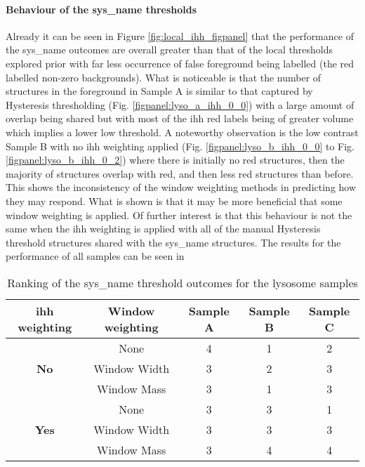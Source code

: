 \paragraph{Behaviour of the \gls{sys_name} thresholds}
Already it can be seen in Figure \ref{fig:local_ihh_figpanel} that the performance of the \gls{sys_name} outcomes are overall greater than that of the local thresholds explored prior with far less occurrence of false foreground being labelled (the red labelled non-zero backgrounds). What is noticeable is that the number of structures in the foreground in Sample A is similar to that captured by Hysteresis thresholding (Fig. \ref{figpanel:lyso_a_ihh_0_0}) with a large amount of overlap being shared but with most of the \gls{ihh} red labels being of greater volume which implies a lower low threshold. A noteworthy observation is the low contrast Sample B with no \gls{ihh} weighting applied (Fig. \ref{figpanel:lyso_b_ihh_0_0} to Fig. \ref{figpanel:lyso_b_ihh_0_2}) where there is initially no red structures, then the majority of structures overlap with red, and then less red structures than before. This shows the inconsistency of the window weighting methods in predicting how they may respond. What is shown is that it may be more beneficial that some window weighting is applied. Of further interest is that this behaviour is not the same when the \gls{ihh} weighting is applied with all of the manual Hysteresis threshold structures shared with the \gls{sys_name} structures. The results for the performance of all samples can be seen in 
\begin{table}[h!]
    \centering
    \begin{tabular}{ccccc}
    \hline
    \textbf{\gls{ihh} weighting} & \textbf{Window weighting} & \textbf{Sample A} & \textbf{Sample B} & \textbf{Sample C} \\ \hline
    \multirow{3}{*}{\textbf{No}} & None & 4 & 1 & 2 \\
    & Window Width & 3 & 2 & 3 \\ & Window Mass & 3 & 1 & 3\\ \hline
    \multirow{3}{*}{\textbf{Yes}} & None & 3 & 3 & 1 \\
    & Window Width & 3 & 3 & 3 \\ & Window Mass & 3 & 4 & 4 \\ \hline
    \end{tabular}
    \caption[Ranking of the AHT threshold outcomes for the lysosome samples]{Ranking of the \gls{sys_name} threshold outcomes for the lysosome samples}
    \label{tab:ihh_lyso_rankings}
\end{table}
